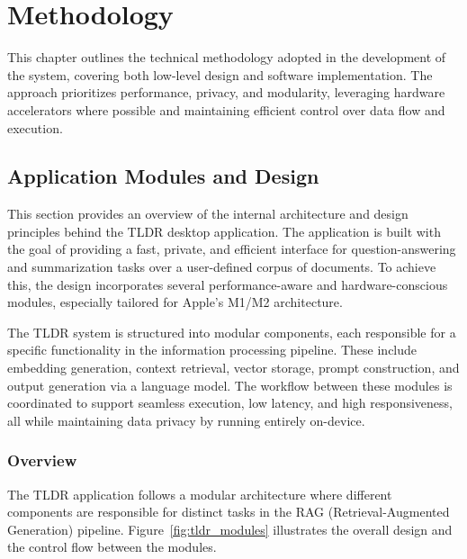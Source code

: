 \chapter{Methodology}
\label{ch:Methodology}
This chapter outlines the technical methodology adopted in the development of the system, covering both low-level design and software implementation. The approach prioritizes performance, privacy, and modularity, leveraging hardware accelerators where possible and maintaining efficient control over data flow and execution.


\section{Application Modules and Design}
\label{sec:ApplicationDesignModules}

This section provides an overview of the internal architecture and design principles behind the TLDR desktop application. The application is built with the goal of providing a fast, private, and efficient interface for question-answering and summarization tasks over a user-defined corpus of documents. To achieve this, the design incorporates several performance-aware and hardware-conscious modules, especially tailored for Apple’s M1/M2 architecture.

The TLDR system is structured into modular components, each responsible for a specific functionality in the information processing pipeline. These include embedding generation, context retrieval, vector storage, prompt construction, and output generation via a language model. The workflow between these modules is coordinated to support seamless execution, low latency, and high responsiveness, all while maintaining data privacy by running entirely on-device.


\subsection{Overview}
\label{subsec:AppDesignModules-Overview}
The TLDR application follows a modular architecture where different components are responsible for distinct tasks in the RAG (Retrieval-Augmented Generation) pipeline. Figure~\ref{fig:tldr_modules} illustrates the overall design and the control flow between the modules.

